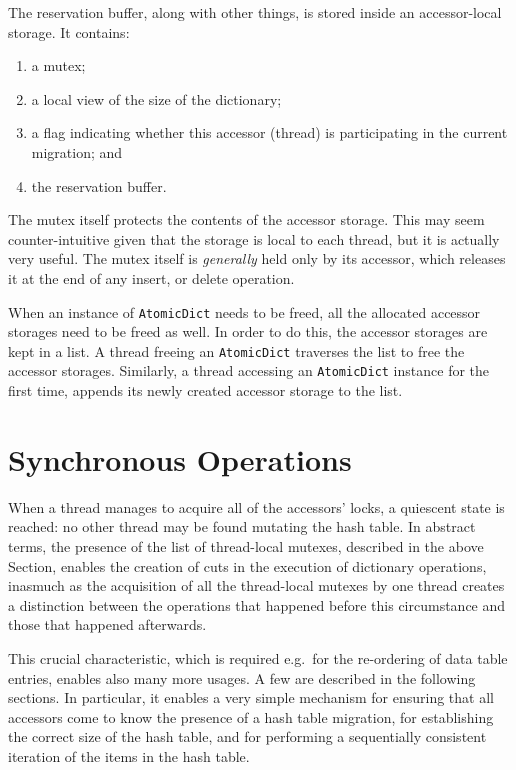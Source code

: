 The reservation buffer, along with other things, is stored inside an accessor-local storage.
It contains:
\begin{enumerate}
    \item a mutex;
    \item a local view of the size of the dictionary;
    \item a flag indicating whether this accessor (thread) is participating in the current migration; and
    \item the reservation buffer.
\end{enumerate}

The mutex itself protects the contents of the accessor storage.
This may seem counter-intuitive given that the storage is local to each thread, but it is actually very useful.
The mutex itself is \emph{generally} held only by its accessor, which releases it at the end of any insert, or delete operation.

When an instance of \texttt{AtomicDict} needs to be freed, all the allocated accessor storages need to be freed as well.
In order to do this, the accessor storages are kept in a list.
A thread freeing an \texttt{AtomicDict} traverses the list to free the accessor storages.
Similarly, a thread accessing an \texttt{AtomicDict} instance for the first time, appends its newly created accessor storage to the list.


\section{Synchronous Operations}\label{sec:synchronous-operations}

When a thread manages to acquire all of the accessors' locks, a quiescent state is reached: no other thread may be found mutating the hash table.
In abstract terms, the presence of the list of thread-local mutexes, described in the above Section, enables the creation of cuts in the execution of dictionary operations, inasmuch as the acquisition of all the thread-local mutexes by one thread creates a distinction between the operations that happened before this circumstance and those that happened afterwards.

This crucial characteristic, which is required e.g.\ for the re-ordering of data table entries, enables also many more usages.
A few are described in the following sections.
In particular, it enables a very simple mechanism for ensuring that all accessors come to know the presence of a hash table migration, for establishing the correct size of the hash table, and for performing a sequentially consistent iteration of the items in the hash table.

